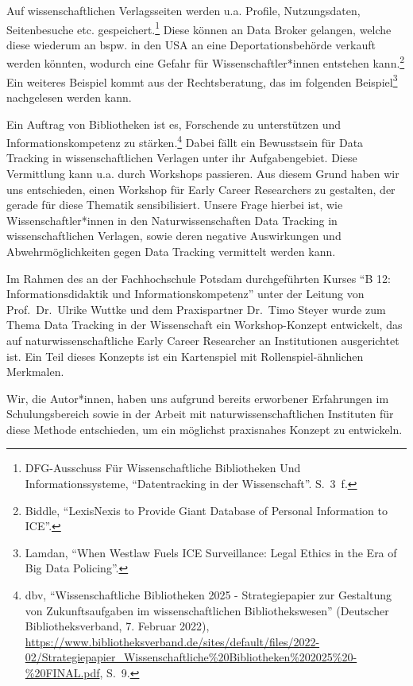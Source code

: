 \documentclass[a4paper,
fontsize=11pt,
oneside,
numbers=noperiodatend,
parskip=half-,
bibliography=totoc,
final
]{scrartcl}
\begin{document}
Auf wissenschaftlichen Verlagsseiten werden u.a. Profile, Nutzungsdaten,
Seitenbesuche etc. gespeichert.\footnote{DFG-Ausschuss Für
  Wissenschaftliche Bibliotheken Und Informationssysteme,
  \enquote{Datentracking in der Wissenschaft}. S.~3~f.} Diese können an
Data Broker gelangen, welche diese wiederum an bspw. in den USA an eine
Deportationsbehörde verkauft werden könnten, wodurch eine Gefahr für
Wissenschaftler*innen entstehen kann.\footnote{Biddle,
  \enquote{LexisNexis to Provide Giant Database of Personal Information
  to ICE}.} Ein weiteres Beispiel kommt aus der Rechtsberatung, das im
folgenden Beispiel\footnote{Lamdan, \enquote{When Westlaw Fuels ICE
  Surveillance: Legal Ethics in the Era of Big Data Policing}.}
nachgelesen werden kann.

Ein Auftrag von Bibliotheken ist es, Forschende zu unterstützen und
Informationskompetenz zu stärken.\footnote{dbv,
  \enquote{Wissenschaftliche Bibliotheken 2025 - Strategiepapier zur
  Gestaltung von Zukunftsaufgaben im wissenschaftlichen
  Bibliothekswesen} (Deutscher Bibliotheksverband, 7. Februar 2022),
  \url{https://www.bibliotheksverband.de/sites/default/files/2022-02/Strategiepapier_Wissenschaftliche\%20Bibliotheken\%202025\%20-\%20FINAL.pdf},
  S.~9.} Dabei fällt ein Bewusstsein für Data Tracking in
wissenschaftlichen Verlagen unter ihr Aufgabengebiet. Diese Vermittlung
kann u.a. durch Workshops passieren. Aus diesem Grund haben wir uns
entschieden, einen Workshop für Early Career Researchers zu gestalten,
der gerade für diese Thematik sensibilisiert. Unsere Frage hierbei ist,
wie Wissenschaftler*innen in den Naturwissenschaften Data Tracking in
wissenschaftlichen Verlagen, sowie deren negative Auswirkungen und
Abwehrmöglichkeiten gegen Data Tracking vermittelt werden kann.

Im Rahmen des an der Fachhochschule Potsdam durchgeführten Kurses
\enquote{B 12: Informationsdidaktik und Informationskompetenz} unter der
Leitung von Prof.~Dr.~Ulrike Wuttke und dem Praxispartner Dr.~Timo
Steyer wurde zum Thema Data Tracking in der Wissenschaft ein
Workshop-Konzept entwickelt, das auf naturwissenschaftliche Early Career
Researcher an Institutionen ausgerichtet ist. Ein Teil dieses Konzepts
ist ein Kartenspiel mit Rollenspiel-ähnlichen Merkmalen.

Wir, die Autor*innen, haben uns aufgrund bereits erworbener Erfahrungen
im Schulungsbereich sowie in der Arbeit mit naturwissenschaftlichen
Instituten für diese Methode entschieden, um ein möglichst praxisnahes
Konzept zu entwickeln.
\end{document}
